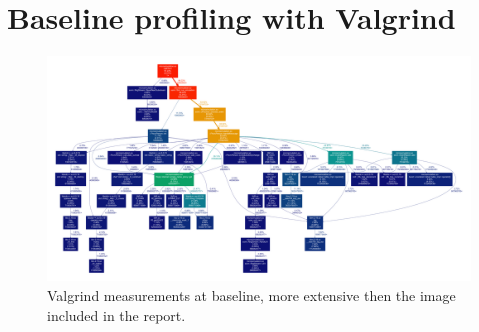 \section{Baseline profiling with Valgrind}
\label{sec:valgrind}
\begin{figure}[!htbp]
  \centering
  \includegraphics[height=0.45\textheight, angle=90]{images/mediumMotivationalValgrind.pdf}
  \caption{Valgrind measurements at baseline, more extensive then the
    image included in the report.}
  \label{fig:mediumValgrind}
\end{figure}







